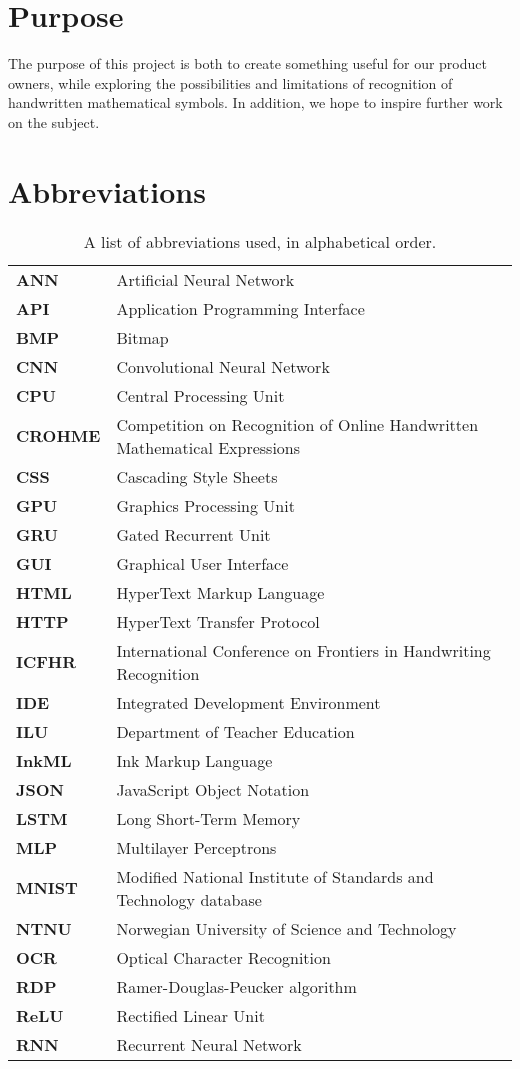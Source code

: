 \section{Purpose}
The purpose of this project is both to create something useful for our product owners, while exploring the possibilities and limitations of recognition of handwritten mathematical symbols. In addition, we hope to inspire further work on the subject. 

\section{Abbreviations}
\begin{table}[H]
\begin{tabular}{ l l }
\textbf{ANN} & Artificial Neural Network \\
\textbf{API} & Application Programming Interface \\
\textbf{BMP} & Bitmap \\
\textbf{CNN} & Convolutional Neural Network \\
\textbf{CPU} & Central Processing Unit \\
\textbf{CROHME} & Competition on Recognition of Online Handwritten Mathematical Expressions\\
\textbf{CSS} & Cascading Style Sheets \\
\textbf{GPU} & Graphics Processing Unit \\
\textbf{GRU} & Gated Recurrent Unit \\
\textbf{GUI} & Graphical User Interface \\
\textbf{HTML} & HyperText Markup Language \\
\textbf{HTTP} & HyperText Transfer Protocol \\
\textbf{ICFHR} & International Conference on Frontiers in Handwriting Recognition \\
\textbf{IDE} & Integrated Development Environment \\
\textbf{ILU} & Department of Teacher Education \\
\textbf{InkML} & Ink Markup Language \\
\textbf{JSON} & JavaScript Object Notation \\
\textbf{LSTM} & Long Short-Term Memory \\
\textbf{MLP} & Multilayer Perceptrons \\
\textbf{MNIST} & Modified National Institute of Standards and Technology database \\
\textbf{NTNU} & Norwegian University of Science and Technology \\
\textbf{OCR} & Optical Character Recognition \\
\textbf{RDP} & Ramer-Douglas-Peucker algorithm \\
\textbf{ReLU} & Rectified Linear Unit \\
\textbf{RNN} & Recurrent Neural Network \\

\end{tabular}
\label{table:abbreviations}
\caption{A list of abbreviations used, in alphabetical order.}
\end{table}